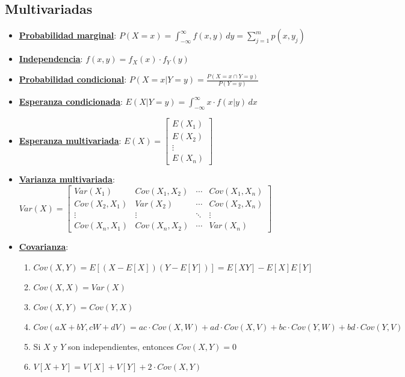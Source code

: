 \subsection{Multivariadas}
\begin{itemize}
  \item \hyperref[sec:probabilidadMarginal]{\textbf{Probabilidad marginal}}: $P(X = x) = \int_{-\infty}^{\infty} f(x, y) \, dy = \sum_{j=1}^{m} p(x, y_j)$

  \item \hyperref[sec:independencia]{\textbf{Independencia}}: $f(x, y) = f_X(x) \cdot f_Y(y)$

  \item \hyperref[sec:probabilidadCondicionalMult]{\textbf{Probabilidad condicional}}: $P(X = x | Y = y) = \frac{P(X = x \cap Y = y)}{P(Y = y)}$ 
 
  \item \hyperref[sec:esperanzaCondicionada]{\textbf{Esperanza condicionada}}: $E(X|Y = y) = \int_{-\infty}^{\infty} x \cdot f(x|y) \, dx$

  \item \hyperref[sec:esperanzaMultivariada]{\textbf{Esperanza multivariada}}: $E(X) = \begin{bmatrix} E(X_1) \\ E(X_2) \\ \vdots \\ E(X_n) \end{bmatrix}$

  \item \hyperref[sec:varianzaMultivariada]{\textbf{Varianza multivariada}}: $Var(X) = \begin{bmatrix} Var(X_1) & Cov(X_1, X_2) & \cdots & Cov(X_1, X_n) \\ Cov(X_2, X_1) & Var(X_2) & \cdots & Cov(X_2, X_n) \\ \vdots & \vdots & \ddots & \vdots \\ Cov(X_n, X_1) & Cov(X_n, X_2) & \cdots & Var(X_n) \end{bmatrix}$

  \item \hyperref[sec:covarianza]{\textbf{Covarianza}}: 
  \begin{enumerate}
    \item $Cov(X, Y) = E[(X - E[X])(Y - E[Y])] = E[XY] - E[X]E[Y]$
    \item $Cov(X, X) = Var(X)$
    \item $Cov(X, Y) = Cov(Y, X)$ 
    \item $Cov(aX + bY, cW + dV) = ac \cdot Cov(X, W) + ad \cdot Cov(X, V) + bc \cdot Cov(Y, W) + bd \cdot Cov(Y, V)$ 
    \item Si $X$ y $Y$ son independientes, entonces $Cov(X, Y) = 0$ 
    \item $V[X+Y] = V[X] + V[Y] + 2 \cdot Cov(X, Y)$
  \end{enumerate}


\end{itemize}
